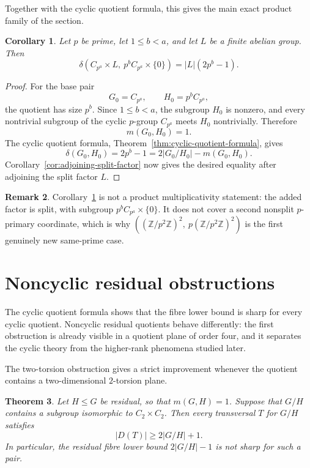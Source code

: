 \documentclass[reqno]{amsart}
\numberwithin{equation}{section}
\newtheorem{theorem}{Theorem}[section]
\newtheorem{corollary}[theorem]{Corollary}
\theoremstyle{definition}
\newtheorem{remark}[theorem]{Remark}
\begin{document}
Together with the cyclic quotient formula, this gives the main exact product
family of the section.
\begin{corollary}
\label{cor:one-nonsplit-cyclic-coordinate}
Let $p$ be prime, let $1\leq b<a$, and let $L$ be a finite abelian group.  Then
\[
  \delta(C_{p^a}\times L,\ p^b C_{p^a}\times\{0\})
  =
  |L|(2p^b-1).
\]
\end{corollary}

\begin{proof}
For the base pair
\[
  G_0=C_{p^a},
  \qquad
  H_0=p^bC_{p^a},
\]
the quotient has size $p^b$.  Since $1\leq b<a$, the subgroup $H_0$ is nonzero,
and every nontrivial subgroup of the cyclic $p$-group $C_{p^a}$ meets $H_0$
nontrivially.  Therefore
\[
  m(G_0,H_0)=1.
\]
The cyclic quotient formula, Theorem~\ref{thm:cyclic-quotient-formula}, gives
\[
  \delta(G_0,H_0)=2p^b-1=2|G_0/H_0|-m(G_0,H_0).
\]
Corollary~\ref{cor:adjoining-split-factor} now gives the desired equality after
adjoining the split factor $L$.
\end{proof}

\begin{remark}
Corollary~\ref{cor:one-nonsplit-cyclic-coordinate} is not a product
multiplicativity statement: the added factor is split, with subgroup
$p^bC_{p^a}\times\{0\}$.  It does not cover a second nonsplit $p$-primary
coordinate, which is why
\(((\mathbb Z/p^2\mathbb Z)^2,\ p(\mathbb Z/p^2\mathbb Z)^2)\) is the first
genuinely new same-prime case.
\end{remark}

\section{Noncyclic residual obstructions}
\label{sec:noncyclic-obstructions}

The cyclic quotient formula shows that the fibre lower bound is sharp for every
cyclic quotient.  Noncyclic residual quotients behave differently: the first
obstruction is already visible in a quotient plane of order four, and it
separates the cyclic theory from the higher-rank phenomena studied later.

The two-torsion obstruction gives a strict improvement whenever the quotient
contains a two-dimensional \(2\)-torsion plane.
\begin{theorem}
\label{thm:residual-two-torsion-obstruction}
Let $H\leq G$ be residual, so that $m(G,H)=1$.  Suppose that $G/H$ contains a
subgroup isomorphic to $C_2\times C_2$.  Then every transversal $T$ for $G/H$
satisfies
\[
  |D(T)|\geq 2|G/H|+1.
\]
In particular, the residual fibre lower bound $2|G/H|-1$ is not sharp for such a
pair.
\end{theorem}
\end{document}
